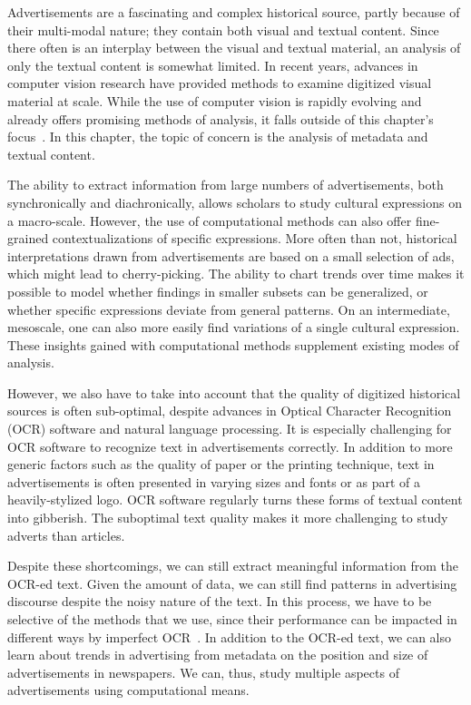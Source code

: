 \documentclass[USenglish]{article}
\begin{document}
Advertisements are a fascinating and complex historical source, partly because of their multi-modal nature; they contain both visual and textual content. Since there often is an interplay between the visual and textual material, an analysis of only the textual content is somewhat limited. In recent years, advances in computer vision research have provided methods to examine digitized visual material at scale. While the use of computer vision is rapidly evolving and already offers promising methods of analysis, it falls outside of this chapter's focus~\cite{wevers_visual_2020,arnold_distant_2019,Bergel_2015}. In this chapter, the topic of concern is the  analysis of metadata and textual content.

The ability to extract information from large numbers of advertisements, both synchronically and diachronically, allows scholars to study cultural expressions on a macro-scale. However, the use of computational methods can also offer fine-grained contextualizations of specific expressions. More often than not, historical interpretations drawn from advertisements are based on a small selection of ads, which might lead to cherry-picking. The ability to chart trends over time makes it possible to model whether findings in smaller subsets can be generalized, or whether specific expressions deviate from general patterns. On an intermediate, mesoscale, one can also more easily find variations of a single cultural expression. These insights gained with computational methods supplement existing modes of analysis. 

However, we also have to take into account that the quality of digitized historical sources is often sub-optimal, despite advances in Optical Character Recognition (OCR) software and natural language processing. It is especially challenging for OCR software to recognize text in advertisements correctly. In addition to more generic factors such as the quality of paper or the printing technique, text in advertisements is often presented in varying sizes and fonts or as part of a heavily-stylized logo. OCR software regularly turns these forms of textual content into gibberish. The suboptimal text quality makes it more challenging to study adverts than articles.

Despite these shortcomings, we can still extract meaningful information from the OCR-ed text. Given the amount of data, we can still find patterns in advertising discourse despite the noisy nature of the text. In this process, we have to be selective of the methods that we use, since their performance can be impacted in different ways by imperfect OCR~\cite{van_strien_assessing_2020,hillQuantifyingImpactDirty2019}. In addition to the OCR-ed text, we can also learn about trends in advertising from metadata on the position and size of advertisements in newspapers. We can, thus, study multiple aspects of advertisements using computational means. 
\end{document}
